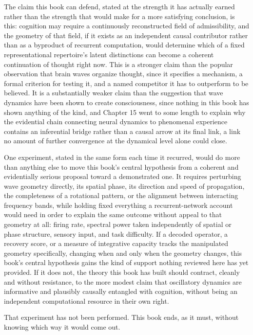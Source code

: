 \documentclass[11pt]{book}
\begin{document}
The claim this book can defend, stated at the strength it has actually earned rather than the strength that would make for a more satisfying conclusion, is this: cognition may require a continuously reconstructed field of admissibility, and the geometry of that field, if it exists as an independent causal contributor rather than as a byproduct of recurrent computation, would determine which of a fixed representational repertoire's latent distinctions can become a coherent continuation of thought right now. This is a stronger claim than the popular observation that brain waves organize thought, since it specifies a mechanism, a formal criterion for testing it, and a named competitor it has to outperform to be believed. It is a substantially weaker claim than the suggestion that wave dynamics have been shown to create consciousness, since nothing in this book has shown anything of the kind, and Chapter 15 went to some length to explain why the evidential chain connecting neural dynamics to phenomenal experience contains an inferential bridge rather than a causal arrow at its final link, a link no amount of further convergence at the dynamical level alone could close.

One experiment, stated in the same form each time it recurred, would do more than anything else to move this book's central hypothesis from a coherent and evidentially serious proposal toward a demonstrated one. It requires perturbing wave geometry directly, its spatial phase, its direction and speed of propagation, the completeness of a rotational pattern, or the alignment between interacting frequency bands, while holding fixed everything a recurrent-network account would need in order to explain the same outcome without appeal to that geometry at all: firing rate, spectral power taken independently of spatial or phase structure, sensory input, and task difficulty. If a decoded operator, a recovery score, or a measure of integrative capacity tracks the manipulated geometry specifically, changing when and only when the geometry changes, this book's central hypothesis gains the kind of support nothing reviewed here has yet provided. If it does not, the theory this book has built should contract, cleanly and without resistance, to the more modest claim that oscillatory dynamics are informative and plausibly causally entangled with cognition, without being an independent computational resource in their own right.

That experiment has not been performed. This book ends, as it must, without knowing which way it would come out.
\end{document}
